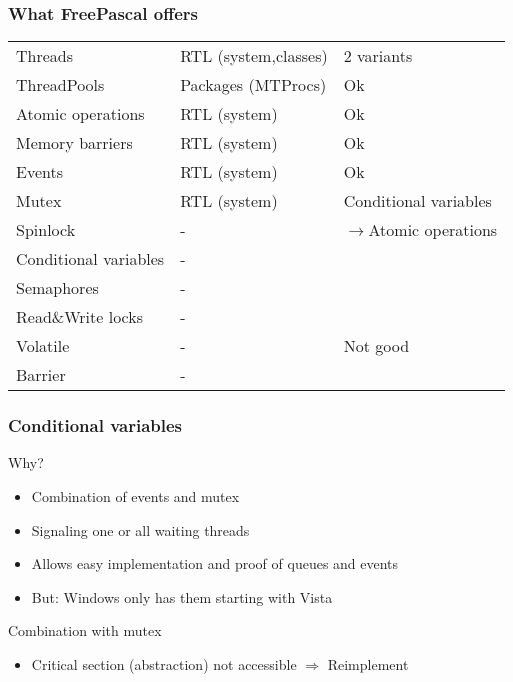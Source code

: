 \documentclass{beamer}
\begin{document}
\begin{frame}
\frametitle{What FreePascal offers}
\begin{tabular}{l|l|l}
 \color{green}Threads & \color{green}RTL (system,classes) & \color{green}2 variants\\
 \color{green}ThreadPools & \color{green}Packages (MTProcs) & \color{green}Ok\\
 \color{green}Atomic operations & \color{green}RTL (system) & \color{green}Ok\\
 \color{green}Memory barriers & \color{green}RTL (system) & \color{green}Ok\\
 \color{green}Events & \color{green}RTL (system) & \color{green}Ok\\
 \color{orange}Mutex & \color{orange}RTL (system) & \color{orange}Conditional variables\\
 \color{orange}Spinlock & \color{orange}- & \color{orange}$\to$Atomic operations\\
 \color{red}Conditional variables & \color{red}- & \color{red}\\
 \color{red}Semaphores & \color{red}- & \color{red}\\
 \color{red}Read\&Write locks & \color{red}- & \color{red}\\
 \color{red}Volatile & \color{red}- &\color{red}Not good\\
 \color{red}Barrier & \color{red}- &\color{red}\\
\end{tabular}
\end{frame}

\begin{frame}
\frametitle{Conditional variables}
\begin{center}
Why?
\end{center}
\begin{itemize}
 \item Combination of events and mutex
 \item Signaling one or all waiting threads
 \item Allows easy implementation and proof of queues and events
 \item But: Windows only has them starting with Vista
\end{itemize}
\begin{center}
Combination with mutex
\end{center}
\begin{itemize}
 \item Critical section (abstraction) not accessible $\Rightarrow$ Reimplement
\end{itemize}
\end{frame}
\end{document}
